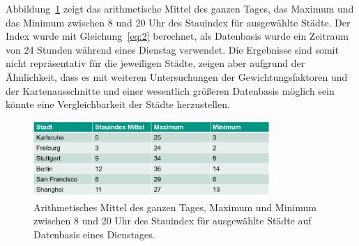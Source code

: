 Abbildung~\ref{fig:index_tabelle} zeigt das arithmetische Mittel des ganzen Tages, das Maximum und das Minimum zwischen 8 und 20 Uhr des Stauindex für ausgewählte Städte. Der Index wurde mit Gleichung~\ref{eq:2} berechnet, als Datenbasis wurde ein Zeitraum von 24 Stunden während eines Dienstag verwendet. Die Ergebnisse sind somit nicht repräsentativ für die jeweiligen Städte, zeigen aber aufgrund der Ähnlichkeit, dass es mit weiteren Untersuchungen der Gewichtungsfaktoren und der Kartenausschnitte und einer wesentlich größeren Datenbasis möglich sein könnte eine Vergleichbarkeit der Städte herzustellen.

\begin{figure}
  \centering
    \includegraphics[width=0.8\textwidth]{images/index_tabelle.png}
    \caption{Arithmetisches Mittel des ganzen Tages, Maximum und Minimum zwischen 8 und 20 Uhr des Stauindex für ausgewählte Städte auf Datenbasis eines Dienstages.}
    \label{fig:index_tabelle}
\end{figure}
